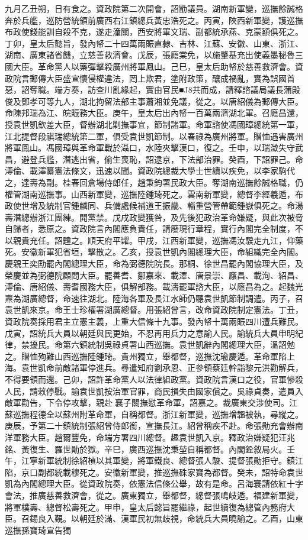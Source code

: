 \begin{pinyinscope}
九月乙丑朔，日有食之。資政院第二次開會，詔勖議員。湖南新軍變，巡撫餘誠格奔於兵艦，巡防營統領前廣西右江鎮總兵黃忠浩死之。丙寅，陜西新軍變，護巡撫布政使錢能訓自殺不克，遂走潼關，西安將軍文瑞、副都統承燕、克蒙額俱死之。丁卯，皇太后懿旨，發內帑二十四萬兩賑直隸、吉林、江蘇、安徽、山東、浙江、湖南、廣東諸省饑，立慈善救濟會。戊辰，張廕棠免，以施肇基充出使義墨秘魯三國大臣。革命黨人以藥彈擊殺廣州將軍鳳山。己巳，皇太后助帑於慈善救濟會。資政院言郵傳大臣盛宣懷侵權違法，罔上欺君，塗附政策，釀成禍亂，實為誤國首惡，詔奪職。端方奏，訪查川亂緣起，實由官民■J8共而成，請釋諮議局議長蒲殿俊及鄧孝可等九人，湖北拘留法部主事蕭湘並免議，從之。以唐紹儀為郵傳大臣。命陳邦瑞為江、皖賑務大臣。庚午，皇太后出內帑一百萬兩濟湖北軍。召廕昌還，授袁世凱欽差大臣，督辦湖北剿撫事宜，節制諸軍。命軍諮使馮國璋總統第一軍，江北提督段祺瑞總統第二軍，俱受袁世凱節制。以春祿為廣州將軍。贈恤遇害廣州將軍鳳山。馮國璋與革命軍戰於灄口，水陸夾擊漢口，復之。壬申，以瑞澂失守武昌，避登兵艦，潛逃出省，偷生喪恥，詔逮京，下法部治罪。癸酉，下詔罪己。命溥倫、載澤纂憲法條文，迅速以聞。資政院總裁大學士世續以疾免，以李家駒代之，達壽為副。桂春回倉場侍郎任，趙秉鈞署民政大臣。奪湖南巡撫餘誠格職，仍權管湖南巡撫事。山西新軍變，巡撫陸鍾琦死之。雲南新軍變，總督李經羲遁，布政使世增及統制官鍾麟同、兵備處候補道王振畿、輜重營管帶範鍾嶽俱死之。命湯壽潛總辦浙江團練。開黨禁。戊戌政變獲咎，及先後犯政治革命嫌疑，與此次被脅自歸者，悉原之。資政院言內閣應負責任，請廢現行章程，實行內閣完全制度，不以親貴充任。詔韙之。順天府平糶。甲戌，江西新軍變，巡撫馮汝騤走九江，仰藥死。安徽新軍犯省垣，擊散之。乙亥，授袁世凱內閣總理大臣，命組織完全內閣。慶親王奕劻罷內閣總理大臣，命為弼德院院長。那桐、徐世昌罷內閣協理大臣，及榮慶並為弼德院顧問大臣。罷善耆、鄒嘉來、載澤、唐景崇、廕昌、載洵、紹昌、溥倫、唐紹儀、壽耆國務大臣，俱解部務。載濤罷軍諮大臣，以廕昌為之。起魏光燾為湖廣總督，命速往湖北。陸海各軍及長江水師仍聽袁世凱節制調遣。丙子，召袁世凱來京。命王士珍權署湖廣總督。用張紹曾言，改命資政院制定憲法。丁丑，資政院奏採用君主立憲主義，上重大信條十九事。發內帑十萬兩賑四川遭兵難民。戊寅，詔統兵大員以朝廷與民更始，不忍再用兵力之意諭人民。諭統兵大員申明紀律，禁擾民。命第六鎮統制吳祿貞署山西巡撫。袁世凱辭內閣總理大臣，溫詔勉之。贈恤殉難山西巡撫陸鍾琦。貴州獨立，舉都督，巡撫沈瑜慶遁。革命軍陷上海。袁世凱命前敵諸軍停進兵。尋遣知府劉承恩、正參領蔡廷幹詣黎元洪勸解兵，不得要領而還。己卯，詔許革命黨人以法律組政黨。資政院言漢口之役，官軍慘殺人民，請敕停戰。諭袁世凱按治軍官罪，商民損失由國家償之。吳祿貞奏，遣員入敵軍勸告，下令停攻擊，親赴襄子關撫慰革命軍，詔嘉之。裁廣東交涉使司。江蘇巡撫程德全以蘇州附革命軍，自稱都督。浙江新軍變，巡撫增韞被執，尋縱之。庚辰，予第二十鎮統制張紹曾侍郎銜，宣撫長江。紹曾稱疾不赴。命張勛充會辦南洋軍務大臣。趙爾豐免，命端方署四川總督。趣袁世凱入京。釋政治嫌疑犯汪兆銘、黃復生、羅世勛於獄。辛巳，廣西巡撫沈秉堃自稱都督。內閣銓敘局火。壬午，江寧新軍統制徐紹楨以其軍變，將軍鐵良、總督張人駿、提督張勛拒守。鎮江陷，京口副都統載穆死之。安徽新軍變，推巡撫硃家寶為都督。癸未，詔特命袁世凱為內閣總理大臣。從資政院奏，依憲法信條公舉，故有是命。呂海寰請依紅十字會法，推廣慈善救濟會，從之。廣東獨立，舉都督，總督張鳴岐遁。福建新軍變，將軍樸壽、總督松壽死之。甲申，皇太后懿旨罷繼祿，起世續復為總管內務府大臣。召錫良入覲。以朝廷於滿、漢軍民初無歧視，命統兵大員曉諭之。乙酉，山東巡撫孫寶琦宣告獨
\end{pinyinscope}
